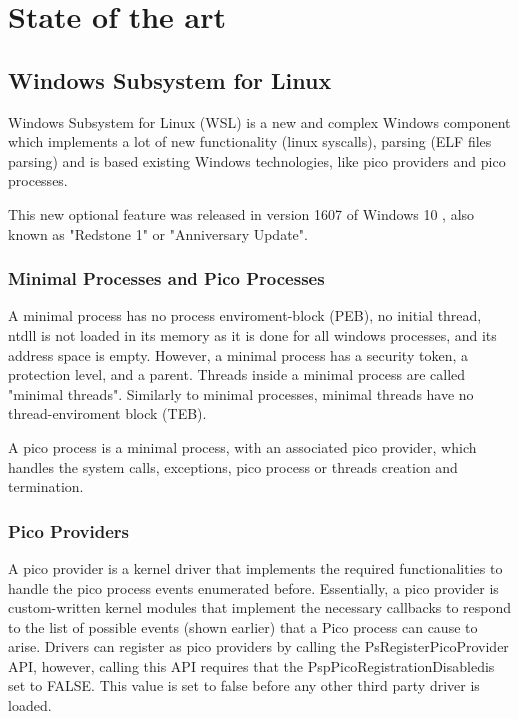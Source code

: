 \chapter{State of the art}
    \section{Windows Subsystem for Linux}
    Windows Subsystem for Linux (WSL) is a new and complex Windows component which implements a lot of new functionality (linux syscalls),
    parsing (ELF files parsing) and is based existing Windows technologies, like pico providers and pico processes.
    
    This new optional feature was released in version 1607 of Windows 10 \cite{WindowsInternals}, also known as "Redstone 1" or
    "Anniversary Update".

        \subsection{Minimal Processes and Pico Processes}
            A minimal process has no process enviroment-block (PEB), no initial thread, ntdll is not loaded in its memory as it is done
            for all windows processes, and its address space is empty. However, a minimal process has a security token, a protection level,
            and a parent. Threads inside a minimal process are called "minimal threads". Similarly to minimal processes, minimal threads
            have no thread-enviroment block (TEB).

            A pico process is a minimal process, with an associated pico provider, which handles the system calls, exceptions, pico process
            or threads creation and termination.    

        \subsection{Pico Providers}
            A pico provider is a kernel driver that implements the required functionalities to handle the pico process events enumerated before.
            Essentially, a pico provider is custom-written kernel modules that implement the necessary callbacks to respond to the list of
            possible events (shown earlier) that a Pico process can cause to arise\cite{WindowsInternals}. Drivers can register as pico providers by calling the
            PsRegisterPicoProvider API, however, calling this API requires that the PspPicoRegistrationDisabledis set to FALSE. This value is
            set to false before any other third party driver is loaded.
            
